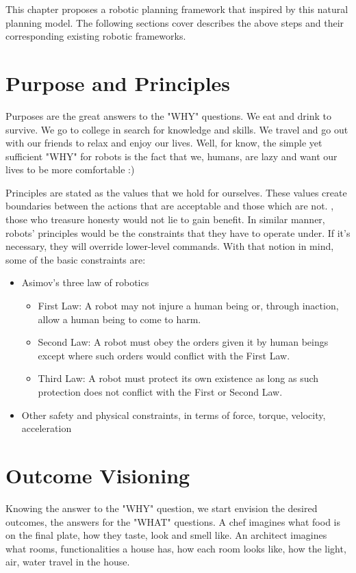 This chapter proposes a robotic planning framework that inspired by this natural planning model. The following sections cover describes the above steps and their corresponding existing robotic frameworks.

\section{Purpose and Principles}
Purposes are the great answers to the "WHY" questions. We eat and drink to survive. We go to college in search for knowledge and skills. We travel and go out with our friends to relax and enjoy our lives. Well, for know, the simple yet sufficient "WHY" for robots is the fact that we, humans, are lazy and want our lives to be more comfortable :)

Principles are stated as the values that we hold for ourselves. These values create boundaries between the actions that are acceptable and those which are not. \Eg, those who treasure honesty would not lie to gain benefit. In similar manner, robots' principles would be the constraints that they have to operate under. If it's necessary, they will override lower-level commands. With that notion in mind, some of the basic constraints are:
\begin{itemize}
	\item Asimov's three law of robotics \cite{asimov2004robot}
	\begin{itemize}
		\item First Law: A robot may not injure a human being or, through inaction, allow a human being to come to harm.
		\item Second Law: A robot must obey the orders given it by human beings except where such orders would conflict with the First Law.
		\item Third Law: A robot must protect its own existence as long as such protection does not conflict with the First or Second Law.
	\end{itemize}
	\item Other safety and physical constraints, in terms of force, torque, velocity, acceleration
\end{itemize}

\section{Outcome Visioning}
Knowing the answer to the "WHY" question, we start envision the desired outcomes, the answers for the "WHAT" questions. A chef imagines what food is on the final plate, how they taste, look and smell like. An architect imagines what rooms, functionalities a house has, how each room looks like, how the light, air, water travel in the house.

